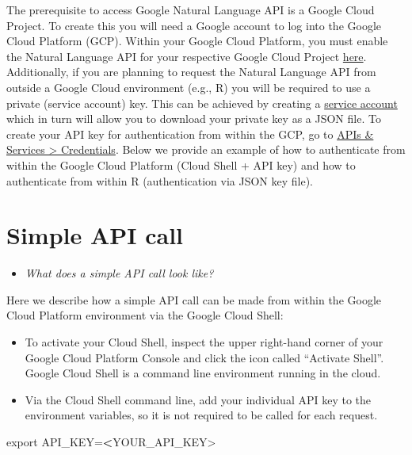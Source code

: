 \documentclass[
]{book}
\newenvironment{Shaded}{\begin{snugshade}}{\end{snugshade}}
\newcommand{\ErrorTok}[1]{\textcolor[rgb]{0.64,0.00,0.00}{\textbf{#1}}}
\newcommand{\NormalTok}[1]{#1}
\newcommand{\OtherTok}[1]{\textcolor[rgb]{0.56,0.35,0.01}{#1}}
\newcommand{\SpecialCharTok}[1]{\textcolor[rgb]{0.00,0.00,0.00}{#1}}
\providecommand{\tightlist}{%
  \setlength{\itemsep}{0pt}\setlength{\parskip}{0pt}}
\begin{document}
The prerequisite to access Google Natural Language API is a Google Cloud Project. To create this you will need a Google account to log into the Google Cloud Platform (GCP). Within your Google Cloud Platform, you must enable the Natural Language API for your respective Google Cloud Project \href{\%22https://console.cloud.google.com/marketplace/product/google/language.googleapis.com\%22}{here}.
Additionally, if you are planning to request the Natural Language API from outside a Google Cloud environment (e.g., R) you will be required to use a private (service account) key. This can be achieved by creating a \href{\%22https://cloud.google.com/docs/authentication/production\#create_service_account\%22}{service account} which in turn will allow you to download your private key as a JSON file. To create your API key for authentication from within the GCP, go to \href{\%22https://console.cloud.google.com/apis/credentials\%22}{APIs \& Services \textgreater{} Credentials}. Below we provide an example of how to authenticate from within the Google Cloud Platform (Cloud Shell + API key) and how to authenticate from within R (authentication via JSON key file).

\hypertarget{simple-api-call}{%
\section{Simple API call}\label{simple-api-call}}

\begin{itemize}
\tightlist
\item
  \emph{What does a simple API call look like?}
\end{itemize}

Here we describe how a simple API call can be made from within the Google Cloud Platform environment via the Google Cloud Shell:

\begin{itemize}
\tightlist
\item
  To activate your Cloud Shell, inspect the upper right-hand corner of your Google Cloud Platform Console and click the icon called ``Activate Shell''. Google Cloud Shell is a command line environment running in the cloud.
\item
  Via the Cloud Shell command line, add your individual API key to the environment variables, so it is not required to be called for each request.
\end{itemize}

\begin{Shaded}
\begin{Highlighting}[]
\NormalTok{export API\_KEY}\OtherTok{=}\ErrorTok{\textless{}}\NormalTok{YOUR\_API\_KEY}\SpecialCharTok{\textgreater{}}
\end{Highlighting}
\end{Shaded}
\end{document}
